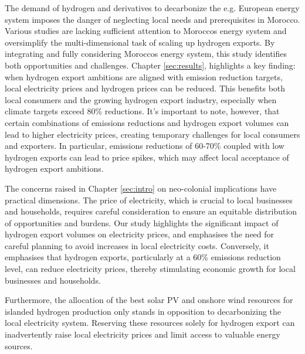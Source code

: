 The demand of hydrogen and derivatives to decarbonize the e.g. European energy system imposes the danger of neglecting local needs and prerequisites in Morocco. Various studies \cite{Wijk2021, AbouSeada2022, Zwaan2021, Schellekens2010, Touili2022, Timmerberg2019, Sens2022} are lacking sufficient attention to Moroccos energy system and oversimplify the multi-dimensional task of scaling up hydrogen exports. By integrating and fully considering Moroccos energy system, this study identifies both opportunities and challenges. Chapter \ref{sec:results}, highlights a key finding: when hydrogen export ambitions are aligned with emission reduction targets, local electricity prices and hydrogen prices can be reduced. This benefits both local consumers and the growing hydrogen export industry, especially when climate targets exceed 80\% reductions. It's important to note, however, that certain combinations of emissions reductions and hydrogen export volumes can lead to higher electricity prices, creating temporary challenges for local consumers and exporters. In particular, emissions reductions of 60-70\% coupled with low hydrogen exports can lead to price spikes, which may affect local acceptance of hydrogen export ambitions.

The concerns raised in Chapter \ref{sec:intro} on neo-colonial implications have practical dimensions. The price of electricity, which is crucial to local businesses and households, requires careful consideration to ensure an equitable distribution of opportunities and burdens. Our study highlights the significant impact of hydrogen export volumes on electricity prices, and emphasises the need for careful planning to avoid increases in local electricity costs. Conversely, it emphasises that hydrogen exports, particularly at a 60\% emissions reduction level, can reduce electricity prices, thereby stimulating economic growth for local businesses and households.


Furthermore, the allocation of the best solar PV and onshore wind resources for islanded hydrogen production only stands in opposition to decarbonizing the local electricity system. Reserving these resources solely for hydrogen export can inadvertently raise local electricity prices and limit access to valuable energy sources.

